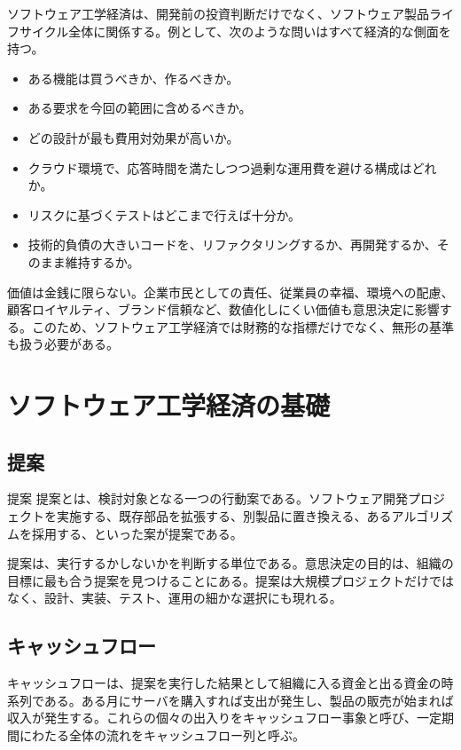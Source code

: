 \documentclass[a4paper,11pt]{article}
\begin{document}
ソフトウェア工学経済は、開発前の投資判断だけでなく、ソフトウェア製品ライフサイクル全体に関係する。例として、次のような問いはすべて経済的な側面を持つ。
\begin{itemize}
  \item ある機能は買うべきか、作るべきか。
  \item ある要求を今回の範囲に含めるべきか。
  \item どの設計が最も費用対効果が高いか。
  \item クラウド環境で、応答時間を満たしつつ過剰な運用費を避ける構成はどれか。
  \item リスクに基づくテストはどこまで行えば十分か。
  \item 技術的負債の大きいコードを、リファクタリングするか、再開発するか、そのまま維持するか。
\end{itemize}

価値は金銭に限らない。企業市民としての責任、従業員の幸福、環境への配慮、顧客ロイヤルティ、ブランド信頼など、数値化しにくい価値も意思決定に影響する。このため、ソフトウェア工学経済では財務的な指標だけでなく、無形の基準も扱う必要がある。

\section{ソフトウェア工学経済の基礎}

\subsection{提案}

\begin{defbox}{提案}
提案とは、検討対象となる一つの行動案である。ソフトウェア開発プロジェクトを実施する、既存部品を拡張する、別製品に置き換える、あるアルゴリズムを採用する、といった案が提案である。
\end{defbox}

提案は、実行するかしないかを判断する単位である。意思決定の目的は、組織の目標に最も合う提案を見つけることにある。提案は大規模プロジェクトだけではなく、設計、実装、テスト、運用の細かな選択にも現れる。

\subsection{キャッシュフロー}

キャッシュフローは、提案を実行した結果として組織に入る資金と出る資金の時系列である。ある月にサーバを購入すれば支出が発生し、製品の販売が始まれば収入が発生する。これらの個々の出入りをキャッシュフロー事象と呼び、一定期間にわたる全体の流れをキャッシュフロー列と呼ぶ。
\end{document}
